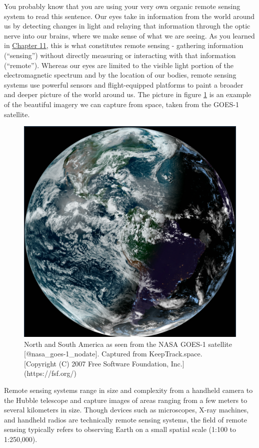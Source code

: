 \documentclass[
]{book}
\begin{document}
You probably know that you are using your very own organic remote sensing system to read this sentence. Our eyes take in information from the world around us by detecting changes in light and relaying that information through the optic nerve into our brains, where we make sense of what we are seeing. As you learned in \href{https://ubc-geomatics-textbook.github.io/geomatics-textbook/fundamentals-of-remote-sensing.html}{Chapter 11}, this is what constitutes remote sensing - gathering information (``sensing'') without directly measuring or interacting with that information (``remote''). Whereas our eyes are limited to the visible light portion of the electromagnetic spectrum and by the location of our bodies, remote sensing systems use powerful sensors and flight-equipped platforms to paint a broader and deeper picture of the world around us. The picture in figure \ref{fig:12-GOES-1-earth} is an example of the beautiful imagery we can capture from space, taken from the GOES-1 satellite.

\begin{figure}
\includegraphics[width=0.9\linewidth]{images/12-GOES_1_earth} \caption{North and South America as seen from the NASA GOES-1 satellite [@nasa_goes-1_nodate]. Captured from KeepTrack.space. [Copyright (C) 2007 Free Software Foundation, Inc.](https://fsf.org/)}\label{fig:12-GOES-1-earth}
\end{figure}

Remote sensing systems range in size and complexity from a handheld camera to the Hubble telescope and capture images of areas ranging from a few meters to several kilometers in size. Though devices such as microscopes, X-ray machines, and handheld radios are technically remote sensing systems, the field of remote sensing typically refers to observing Earth on a small spatial scale (1:100 to 1:250,000).
\end{document}
